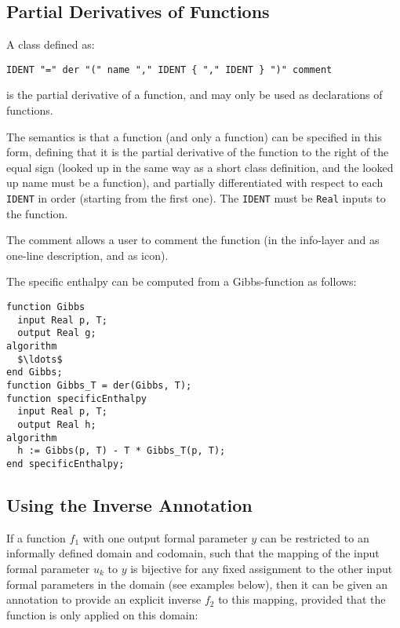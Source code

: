 \subsection{Partial Derivatives of Functions}\label{partial-derivatives-of-functions}

A class defined as:
\begin{lstlisting}[language=grammar]
IDENT "=" der "(" name "," IDENT { "," IDENT } ")" comment
\end{lstlisting}
is the partial derivative of a function, and may only be used as declarations of functions.

The semantics is that a function (and only a function) can be specified in this form, defining that it is the partial derivative of the function to the right of the equal sign (looked up in the same way as a short class definition, and the looked up name must be a function), and partially differentiated with respect to each {\lstinline!IDENT!} in order (starting from the first one).  The {\lstinline!IDENT!} must be {\lstinline!Real!} inputs to the function.

The comment allows a user to comment the function (in the info-layer and as one-line description, and as icon).

\begin{example}
The specific enthalpy can be computed from a Gibbs-function as follows:
\begin{lstlisting}[language=modelica]
function Gibbs
  input Real p, T;
  output Real g;
algorithm
  $\ldots$
end Gibbs;
function Gibbs_T = der(Gibbs, T);
function specificEnthalpy
  input Real p, T;
  output Real h;
algorithm
  h := Gibbs(p, T) - T * Gibbs_T(p, T);
end specificEnthalpy;
\end{lstlisting}
\end{example}


\subsection{Using the Inverse Annotation}\label{using-the-inverse-annotation}

If a function $f_1$ with one output formal parameter $y$ can be restricted to an informally defined domain and codomain, such that the mapping of the input formal parameter $u_{k}$ to $y$ is bijective for any fixed assignment to the other input formal parameters in the domain (see examples below), then it can be given an  annotation to provide an explicit inverse $f_2$ to this mapping, provided that the function is only applied on this domain:

